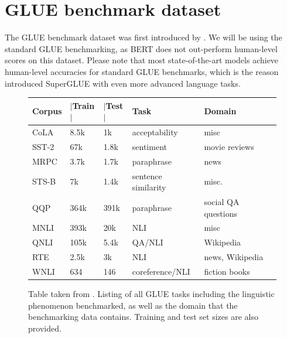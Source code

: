 \documentclass[a4paper,12pt,twoside,openright]{report}
\begin{document}
\section{GLUE benchmark dataset}

The GLUE benchmark dataset was first introduced by \cite{wang19}.
We will be using the standard GLUE benchmarking, as BERT does not out-perform human-level scores on this dataset.
Please note that most state-of-the-art models achieve human-level accuracies for standard GLUE benchmarks, which is the reason \cite{wang19b} introduced SuperGLUE with even more advanced language tasks.

\begin{figure}[h]
\center
\begin{tabular}{
 l %
 l %
 l
 l
 l
 l
}
\toprule
\textbf{Corpus} & \textbf{ $|$Train$|$ } &\textbf{$|$Test$|$} & \textbf{Task} & \textbf{Domain}  \\
\midrule
CoLA  & 8.5k  &  1k   & acceptability &  misc \\

SST-2 & 67k &  1.8k  & sentiment &  movie reviews \\

MRPC & 3.7k &  1.7k & paraphrase & news \\
          
STS-B & 7k &  1.4k    & sentence similarity &  misc. \\
      
QQP & 364k &  391k & paraphrase  &  social QA questions\\	

MNLI & 393k &  20k  & NLI  &  misc \\

QNLI & 105k &  5.4k & QA/NLI &  Wikipedia \\

RTE & 2.5k &  3k      & NLI &  news, Wikipedia \\

WNLI & 634 &  146   & coreference/NLI & fiction books \\

      
\bottomrule
\end{tabular}
\caption{Table taken from \cite{wang19}. Listing of all GLUE tasks including the linguistic phenomenon benchmarked, as well as the domain that the benchmarking data contains. Training and test set sizes are also provided.}
\end{figure}
\end{document}
